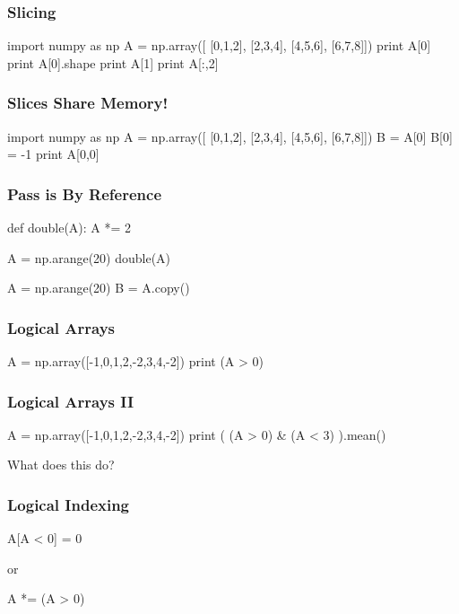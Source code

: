 \begin{frame}[fragile]
\frametitle{Slicing}

\begin{python}
import numpy as np
A = np.array([
    [0,1,2],
    [2,3,4],
    [4,5,6],
    [6,7,8]])
print A[0]
print A[0].shape
print A[1]
print A[:,2]
\end{python}
\end{frame}

\begin{frame}[fragile]
\frametitle{Slices Share Memory!}
\begin{python}
import numpy as np
A = np.array([
    [0,1,2],
    [2,3,4],
    [4,5,6],
    [6,7,8]])
B = A[0]
B[0] = -1
print A[0,0]
\end{python}

\end{frame}

\begin{frame}[fragile]
\frametitle{Pass is By Reference}

\begin{python}
def double(A):
    A *= 2

A = np.arange(20)
double(A)
\end{python}
\pause
\begin{python}
A = np.arange(20)
B = A.copy()
\end{python}
\end{frame}

\begin{frame}[fragile]
\frametitle{Logical Arrays}
\begin{python}
A = np.array([-1,0,1,2,-2,3,4,-2])
print (A > 0)
\end{python}
\end{frame}
\begin{frame}[fragile]
\frametitle{Logical Arrays II}
\begin{python}
A = np.array([-1,0,1,2,-2,3,4,-2])
print ( (A > 0) & (A < 3) ).mean()
\end{python}

What does this do?
\end{frame}

\begin{frame}[fragile]
\frametitle{Logical Indexing}
\begin{python}
A[A < 0] = 0
\end{python}
or
\begin{python}
A *= (A > 0)
\end{python}
\end{frame}


